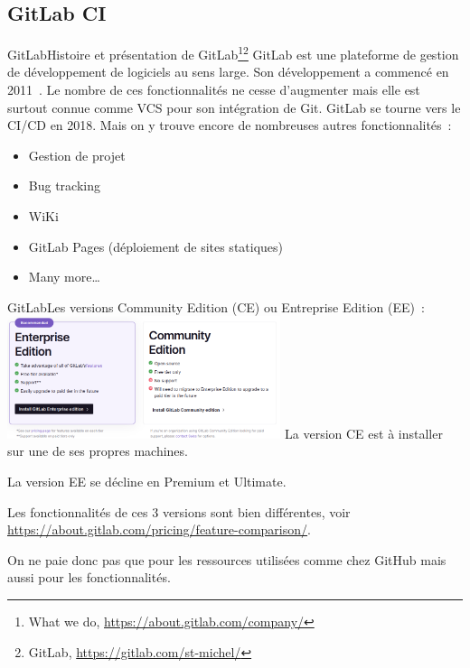 \documentclass{beamer}
\begin{document}
    \subsection{GitLab CI}\label{subsec:gitlab-ci}

    \begin{frame}{GitLab}{Histoire et présentation de GitLab\footnote{What we do, \url{https://about.gitlab.com/company/}}\footnotestep\footnote{GitLab, \url{https://gitlab.com/st-michel/}}}
        \transdissolve
        GitLab est une plateforme de gestion de développement de logiciels au sens large.
        Son développement a commencé en 2011~.
        \bigbreak
        Le nombre de ces fonctionnalités ne cesse d'augmenter mais elle est surtout connue comme VCS pour son intégration de Git.
        \bigbreak
        GitLab se tourne vers le CI/CD en 2018.
        \bigbreak
        Mais on y trouve encore de nombreuses autres fonctionnalités~:
        \begin{itemize}
            \item Gestion de projet
            \item Bug tracking
            \item WiKi
            \item GitLab Pages (déploiement de sites statiques)
            \item Many more\ldots
        \end{itemize}
    \end{frame}

    \begin{frame}{GitLab}{Les versions}
        \transdissolve
        Community Edition (CE) ou Entreprise Edition (EE)~:
        \bigbreak
        \centering
        \includegraphics[width=8cm]{image/gitlab-versions}
        \flushleft
        La version CE est à installer sur une de ses propres machines.

        La version EE se décline en Premium et Ultimate.

        Les fonctionnalités de ces 3 versions sont bien différentes, voir \url{https://about.gitlab.com/pricing/feature-comparison/}.

        On ne paie donc pas que pour les ressources utilisées comme chez GitHub mais aussi pour les fonctionnalités.
    \end{frame}
\end{document}
